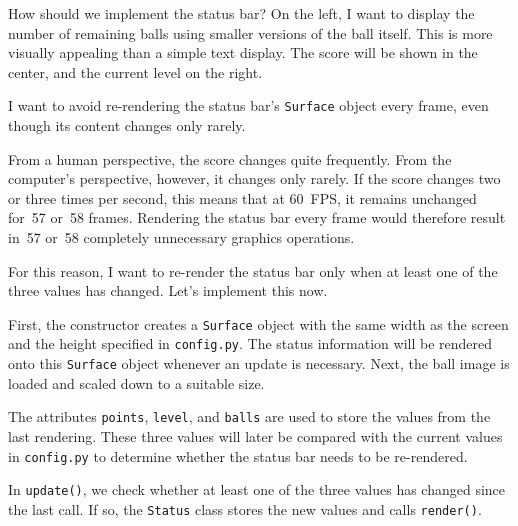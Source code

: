 
How should we implement the status bar? On the left, I want to display the number of remaining balls using smaller versions of the ball itself. This is more visually appealing than a simple text display. The score will be shown in the center, and the current level on the right.

I want to avoid re-rendering the status bar's \texttt{Surface} object every frame, even though its content changes only rarely.

\begin{hintbox}
	From a human perspective, the score changes quite frequently. From the computer's perspective, however, it changes only rarely. If the score changes two or three times per second, this means that at \SI{60}{FPS}, it remains unchanged for~57 or~58 frames. Rendering the status bar every frame would therefore result in~57 or~58 completely unnecessary graphics operations.
\end{hintbox}

For this reason, I want to re-render the status bar only when at least one of the three values has changed. Let's implement this now.

First, the constructor creates a \texttt{Surface} object with the same width as the screen and the height specified in \texttt{config.py}. The status information will be rendered onto this \texttt{Surface} object whenever an update is necessary. Next, the ball image is loaded and scaled down to a suitable size.

The attributes \texttt{points}, \texttt{level}, and \texttt{balls} are used to store the values from the last rendering. These three values will later be compared with the current values in \texttt{config.py} to determine whether the status bar needs to be re-rendered.


In \texttt{update()}, we check whether at least one of the three values has changed since the last call. If so, the \texttt{Status} class stores the new values and calls \texttt{render()}.


